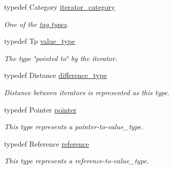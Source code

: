 \begin{DoxyCompactItemize}
\item 
typedef Category \hyperlink{structgxx_1_1iterator_a890c3ac5bbb2229fb98bcf54beca3b51}{iterator\+\_\+category}\hypertarget{structgxx_1_1iterator_a890c3ac5bbb2229fb98bcf54beca3b51}{}\label{structgxx_1_1iterator_a890c3ac5bbb2229fb98bcf54beca3b51}

\begin{DoxyCompactList}\small\item\em One of the \hyperlink{}{tag types}. \end{DoxyCompactList}\item 
typedef Tp \hyperlink{structgxx_1_1iterator_a484ba36182e537f15c2bc3a11263fb8c}{value\+\_\+type}\hypertarget{structgxx_1_1iterator_a484ba36182e537f15c2bc3a11263fb8c}{}\label{structgxx_1_1iterator_a484ba36182e537f15c2bc3a11263fb8c}

\begin{DoxyCompactList}\small\item\em The type \char`\"{}pointed to\char`\"{} by the iterator. \end{DoxyCompactList}\item 
typedef Distance \hyperlink{structgxx_1_1iterator_a2aa041b8a1a9d1aa5fbef6a403a93bda}{difference\+\_\+type}\hypertarget{structgxx_1_1iterator_a2aa041b8a1a9d1aa5fbef6a403a93bda}{}\label{structgxx_1_1iterator_a2aa041b8a1a9d1aa5fbef6a403a93bda}

\begin{DoxyCompactList}\small\item\em Distance between iterators is represented as this type. \end{DoxyCompactList}\item 
typedef Pointer \hyperlink{structgxx_1_1iterator_a9b7c5ba1ec60de1a66b63c367bb6ac1d}{pointer}\hypertarget{structgxx_1_1iterator_a9b7c5ba1ec60de1a66b63c367bb6ac1d}{}\label{structgxx_1_1iterator_a9b7c5ba1ec60de1a66b63c367bb6ac1d}

\begin{DoxyCompactList}\small\item\em This type represents a pointer-\/to-\/value\+\_\+type. \end{DoxyCompactList}\item 
typedef Reference \hyperlink{structgxx_1_1iterator_a6fcadc0838441fafa84c2f1ce5b21944}{reference}\hypertarget{structgxx_1_1iterator_a6fcadc0838441fafa84c2f1ce5b21944}{}\label{structgxx_1_1iterator_a6fcadc0838441fafa84c2f1ce5b21944}

\begin{DoxyCompactList}\small\item\em This type represents a reference-\/to-\/value\+\_\+type. \end{DoxyCompactList}\end{DoxyCompactItemize}


